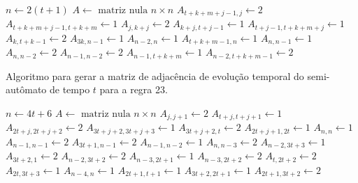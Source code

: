 \documentclass[12pt,a4paper]{article}
\begin{document}
\begin{algorithm}[H]
\begin{algorithmic}
    \STATE $n \leftarrow 2(t+1)$
    \STATE $A \leftarrow \mbox{ matriz nula } n \times n$
        \STATE $A_{t+k+m+j-1,j} \leftarrow 2$
        \STATE $A_{t+k+m+j-1,t+k+m} \leftarrow 1$
    \ENDFOR
            \STATE $A_{j,k+j} \leftarrow 2$
            \STATE $A_{k+j,t+j-1} \leftarrow 1$
        \ENDFOR
    \ENDIF
            \STATE $A_{t+j-1,t+k+m+j} \leftarrow 1$
        \ENDFOR
    \ENDIF
        \STATE $A_{k,t+k-1} \leftarrow 2$
    \ELSE
        \STATE $A_{3k,n-1} \leftarrow 1$
    \ENDIF
    \STATE $A_{n-2,n} \leftarrow 1$
    \STATE $A_{t+k+m-1,n} \leftarrow 1$
    \STATE $A_{n,n-1} \leftarrow 1$
    \STATE $A_{n,n-2} \leftarrow 2$
    \STATE $A_{n-1,n-2} \leftarrow 2$
    \STATE $A_{n-1,t+k+m} \leftarrow 1$
    \STATE $A_{n-2,t+k+m-1} \leftarrow 2$
\ENDIF
\end{algorithmic}
\end{algorithm}

\begin{algorithm}[H]
\caption{Algoritmo para gerar a matriz de adjacência de evolução temporal do
semi-autômato de tempo $t$ para a regra 23.}
\label{alg:r23}
\begin{algorithmic}
\STATE $n \leftarrow 4t+6$
\STATE $A \leftarrow \mbox{ matriz nula } n \times n$
        \STATE $A_{j,j+1} \leftarrow 2$
        \STATE $A_{t+j,t+j+1} \leftarrow 1$
        \STATE $A_{2t+j,2t+j+2} \leftarrow 2$
        \STATE $A_{3t+j+2,3t+j+3} \leftarrow 1$
    \ENDFOR
\ENDIF
{}
    \STATE $A_{3t+j+2,t} \leftarrow 2$
    \STATE $A_{2t+j+1,2t} \leftarrow 1$
\ENDFOR
\STATE $A_{n,n} \leftarrow 1$
\STATE $A_{n-1,n-1} \leftarrow 2$
\STATE $A_{3t+1,n-1} \leftarrow 2$
\STATE $A_{n-1,n-2} \leftarrow 1$
\STATE $A_{n,n-3} \leftarrow 2$
\STATE $A_{n-2,3t+3} \leftarrow 1$
\STATE $A_{3t+2,1} \leftarrow 2$
\STATE $A_{n-2,3t+2} \leftarrow 2$
\STATE $A_{n-3,2t+1} \leftarrow 1$
\STATE $A_{n-3,2t+2} \leftarrow 2$
\STATE $A_{t,2t+2} \leftarrow 2$
\STATE $A_{2t,3t+3} \leftarrow 1$
\STATE $A_{n-4,n} \leftarrow 1$
\STATE $A_{2t+1,t+1} \leftarrow 1$
\STATE $A_{3t+2,2t+1} \leftarrow 1$
\STATE $A_{2t+1,3t+2} \leftarrow 2$
\end{algorithmic}
\end{algorithm}
\end{document}
